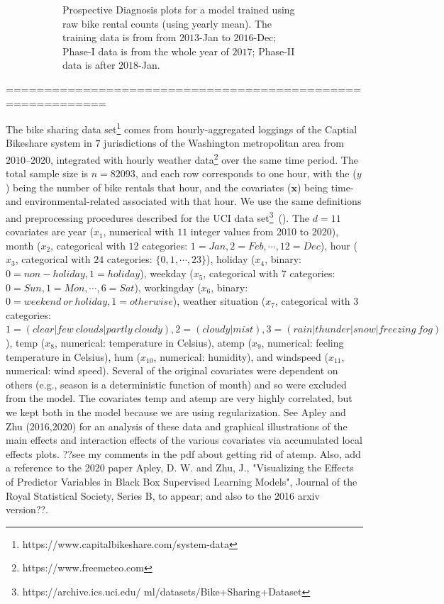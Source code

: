 \documentclass[twoside,11pt]{article}
\begin{document}
\begin{enumerate}
\begin{figure}[H]
\begin{subfigure}[t]{0.32\linewidth}
     \captionsetup{width=.95\linewidth}
     \caption{Prospective Diagnosis plots for a model trained using raw bike rental counts (using yearly mean). The training data is from from $2013$-Jan to $2016$-Dec; Phase-I data is from the whole year of $2017$; Phase-II data is after $2018$-Jan.}
     \label{fig:bs_raw_cnt_2}
\end{subfigure}
\caption{
}
\label{fig:bike_sharing_diag}
\end{figure}

\end{enumerate}


===========================================================

The bike sharing data set\footnote{https://www.capitalbikeshare.com/system-data} comes from hourly-aggregated loggings of the Captial Bikeshare system in $7$ jurisdictions of the Washington metropolitan area from $2010$--$2020$, integrated with hourly weather data\footnote{https://www.freemeteo.com} over the same time period. The total sample size is $n=82093$, and each row corresponds to one hour, with the ($y$) being the number of bike rentals that hour, and the covariates ($\bm {x}$) being time- and environmental-related associated with that hour. We use the same definitions and preprocessing procedures described for the UCI data set\footnote{https://archive.ics.uci.edu/
ml/datasets/Bike+Sharing+Dataset}~(\cite{fanaee2014event}). The $d=11$ covariates are year ($x_1$, numerical with $11$ integer values from 2010 to 2020), month ($x_2$, categorical with $12$ categories: $1=Jan, 2=Feb, \cdots, 12=Dec$), hour ($x_3$, categorical with $24$ categories: $\{0,1,\cdots,23\}$), holiday ($x_4$, binary: $0=non-holiday,1=holiday$), weekday ($x_5$, categorical with $7$ categories: 
$0=Sun,1=Mon,\cdots,6=Sat$), workingday ($x_6$, binary: $0=weekend~or~holiday,1=otherwise$), weather situation ($x_7$, categorical with $3$ categories: $1 = (clear|few~clouds|partly~cloudy), 2=(cloudy|mist), 3=(rain|thunder|snow|freezing~fog)$), temp ($x_8$, numerical: temperature in Celsius), atemp ($x_9$, numerical: feeling temperature in Celsius), hum ($x_{10}$, numerical: humidity), and windspeed ($x_{11}$, numerical: wind speed). Several of the original covariates were dependent on others (e.g., season is a deterministic function of month) and so were excluded from the model. The covariates temp and atemp are very highly correlated, but we kept both in the model because we are using regularization. See Apley and Zhu (2016,2020) for an analysis of these data and graphical illustrations of the main effects and interaction effects of the various covariates via accumulated local effects plots. ??see my comments in the pdf about getting rid of atemp. Also, add a reference to the 2020 paper Apley, D. W. and Zhu, J., "Visualizing the Effects of Predictor Variables in Black Box Supervised Learning Models", Journal of the Royal Statistical Society, Series B, to appear; and also to the 2016 arxiv version??. 
\end{document}
